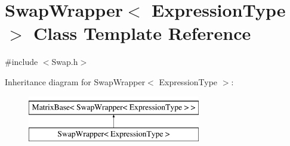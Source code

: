 \hypertarget{class_swap_wrapper}{\section{Swap\-Wrapper$<$ Expression\-Type $>$ Class Template Reference}
\label{class_swap_wrapper}
}


{\ttfamily \#include $<$Swap.\-h$>$}

Inheritance diagram for Swap\-Wrapper$<$ Expression\-Type $>$\-:\begin{figure}[H]
\begin{center}
\leavevmode
\includegraphics[height=2.000000cm]{class_swap_wrapper}
\end{center}
\end{figure}

